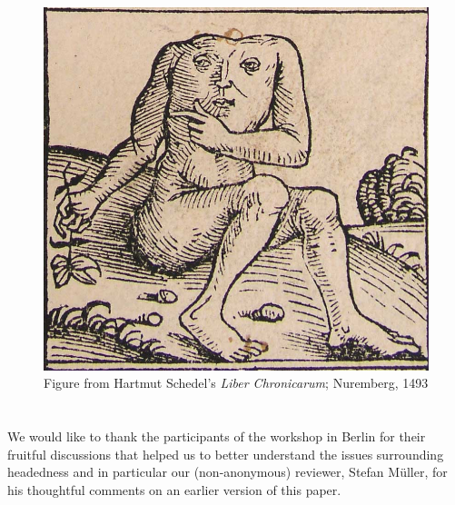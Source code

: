 \documentclass[output=paper
  ,nobabel
  ,draftmode
  ,colorlinks, citecolor=brown
]{langscibook}
\begin{document}
  
\begin{figure}
\includegraphics[width=\textwidth]{Figures/nuremberg-chronicles-strange-people-headless.jpg}
 
\caption{Figure from Hartmut Schedel's \emph{Liber Chronicarum}; Nuremberg, 1493}\label{fig-headless}
\end{figure}


\section*{\acknowledgmentsEN}

\largerpage
We would like to thank the participants of the workshop in Berlin for their fruitful discussions
that helped us to better understand the issues surrounding headedness and in particular our
(non-anonymous) reviewer, Stefan Müller, for his thoughtful comments on an earlier version of this
paper. 


\nocite{chapters/lander,chapters/salzmann,chapters/mueller,chapters/demske,chapters/korth,chapters/haider,chapters/raffelsiefen,chapters/noel,chapters/buecker,chapters/nolda}




{\sloppy
\printbibliography[heading=subbibliography,notkeyword=this]
}
\end{document}
